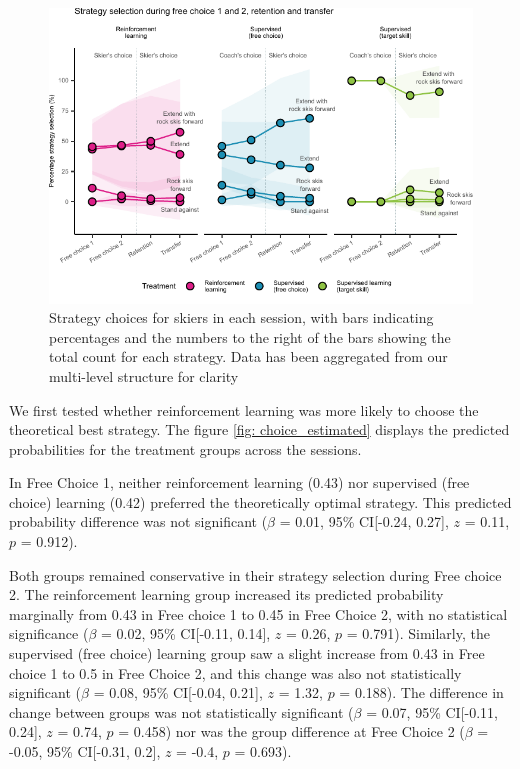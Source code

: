\documentclass[pdflatex,sn-mathphys-num]{sn-jnl}%
\theoremstyle{thmstyleone}%
\theoremstyle{thmstyletwo}%
\theoremstyle{thmstylethree}%
\begin{document}
\begin{figure}[H]
\centering
\includegraphics{figures/figure_choice_descriptivecount_4.pdf}
\caption{Strategy choices for skiers in each session, with bars indicating percentages and the numbers to the right of the bars showing the total count for
each strategy. Data has been aggregated from our multi-level structure for clarity}\label{fig: choice_descriptives}
\end{figure}


We first tested whether reinforcement learning was more likely to choose the theoretical best strategy. The figure \ref{fig: choice_estimated} displays the predicted probabilities for the treatment groups across the sessions. 

In Free Choice 1, neither reinforcement learning (0.43) nor supervised (free choice) learning (0.42) preferred the theoretically optimal strategy. This predicted probability difference was not significant ($\beta$ = 0.01, 95\% CI[-0.24, 0.27], $z$ = 0.11, $p$ = 0.912). 

Both groups remained conservative in their strategy selection during Free choice 2. The reinforcement learning group increased its predicted probability marginally from 0.43 in Free choice 1 to 0.45 in Free Choice 2, with no statistical significance ($\beta$ = 0.02, 95\% CI[-0.11, 0.14], $z$ = 0.26, $p$ = 0.791). Similarly, the supervised (free choice) learning group saw a slight increase from 0.43 in Free choice 1 to 0.5 in Free Choice 2, and this change was also not statistically significant ($\beta$ = 0.08, 95\% CI[-0.04, 0.21], $z$ = 1.32, $p$ = 0.188). The difference in change between groups was not statistically significant ($\beta$ = 0.07, 95\% CI[-0.11, 0.24], $z$ = 0.74, $p$ = 0.458) nor was the group difference at Free Choice 2 ($\beta$ = -0.05, 95\% CI[-0.31, 0.2], $z$ = -0.4, $p$ = 0.693). 
\end{document}

